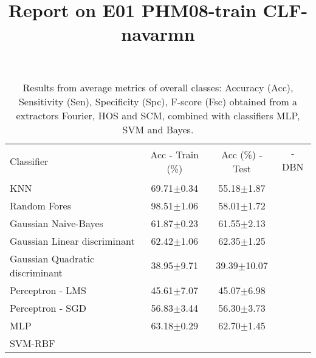 \documentclass[review]{elsarticle}
\begin{document}
\title{Report on E01 PHM08-train CLF-navarmn}

\maketitle


\begin{table}[!htb]
\caption{Results from average metrics of overall classes: Accuracy (Acc), Sensitivity (Sen),  Specificity (Spc), F-score (Fsc) obtained from a extractors Fourier, HOS and SCM, combined with classifiers MLP, SVM and Bayes.}
\centering

\begin{tabular}{lcc|c}
\toprule
\multirow{2}{*}{Classifier}    & \multirow{2}{*}{Acc - Train (\%)}   & \multirow{2}{*}{Acc (\%) - Test} & \cite{tamilselvan2013failure} - DBN \\ 
                      \\ \hline \hline 
KNN      & 69.71$\pm$0.34 & 55.18$\pm$1.87 \\  
Random Fores        & 98.51$\pm$1.06 & 58.01$\pm$1.72 \\
Gaussian Naive-Bayes         & 61.87$\pm$0.23 & 61.55$\pm$2.13 \\
Gaussian Linear discriminant & 62.42$\pm$1.06 & 62.35$\pm$1.25 \\
Gaussian Quadratic discriminant & 38.95$\pm$9.71 & 39.39$\pm$10.07 \\
Perceptron - LMS & 45.61$\pm$7.07 & 45.07$\pm$6.98 \\
Perceptron - SGD & 56.83$\pm$3.44 & 56.30$\pm$3.73 \\
MLP & 63.18$\pm$0.29  & 62.70$\pm$1.45 \\
SVM-RBF &  &  \\
\hline \hline

\bottomrule
\end{tabular}
\label{tab:clf_all}
\end{table}
\end{document}
